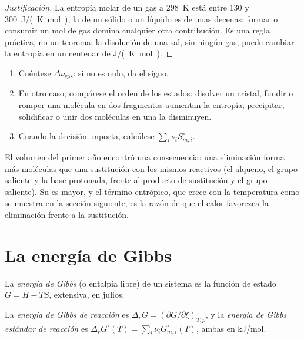 \begin{proof}[Justificación]
La entropía molar de un gas a \qty{298}{K} está entre 130 y
\qty{300}{J/(K.mol)}, la de un sólido o un líquido es de unas decenas: formar o
consumir un mol de gas domina cualquier otra contribución. Es una
regla práctica, no un teorema: la disolución de una sal, sin ningún gas, puede
cambiar la entropía en un centenar de \unit{J/(K.mol)}.
\end{proof}

\begin{method}\label{met:b2:reaction-free-energy:entropy-sign}
\begin{enumerate}
  \item Cuéntese $\Delta\nu_{\text{gas}}$: si no es nulo, da el
        signo.
  \item En otro caso, compárese el orden de los estados: disolver un cristal,
        fundir o romper una molécula en dos fragmentos aumentan la entropía;
        precipitar, solidificar o unir dos moléculas en una la disminuyen.
  \item Cuando la decisión importa, calcúlese $\sum_i\nu_iS^\circ_{m,i}$.
\end{enumerate}
\end{method}

El volumen del primer año encontró una consecuencia: una eliminación forma más moléculas
que una sustitución con los mismos reactivos (el alqueno, el grupo saliente
y la base protonada, frente al producto de sustitución y el grupo
saliente). Su  es mayor, y el término entrópico, que crece
con la temperatura como se muestra en la sección siguiente, es la razón de que el calor favorezca
la eliminación frente a la sustitución.

\section{La energía de Gibbs}

\begin{definition}\label{def:b2:reaction-free-energy:gibbs-energy}
La \emph{energía de Gibbs} (o entalpía libre) de un sistema
es la función de estado $G = H - TS$, extensiva, en julios.
\end{definition}

\begin{definition}\label{def:b2:reaction-free-energy:reaction-gibbs}
La \emph{energía de Gibbs de reacción} es $\Delta_r G
= (\partial G/\partial\xi)_{T,p}$, y la \emph{energía de Gibbs estándar de
reacción} es $\Delta_r G^\circ(T) =
\sum_i\nu_iG^\circ_{m,i}(T)$, ambas en \unit{kJ/mol}.
\end{definition}

